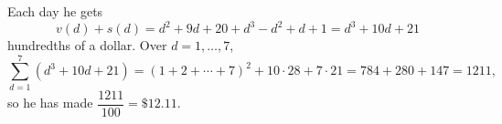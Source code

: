 Each day he gets
\[v(d)+s(d)=d^2+9d+20+d^3-d^2+d+1=d^3+10d+21\]
hundredths of a dollar. Over $d=1,\dots,7$,
\[\sum_{d=1}^{7}\left(d^3+10d+21\right)=(1+2+\cdots+7)^2+10\cdot28+7\cdot21=784+280+147=1211,\]
so he has made $\dfrac{1211}{100}=\boxed{\$12.11}$.
